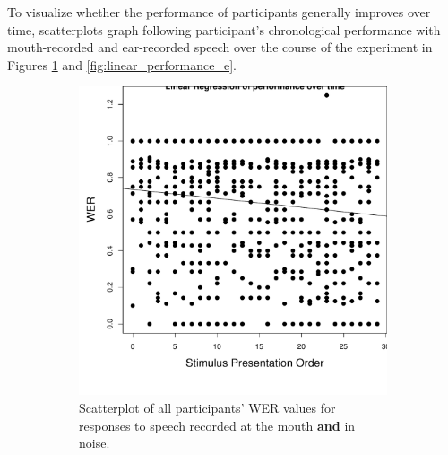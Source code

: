 \documentclass[dissertation,copyright]{uathesis}
\makeatletter
\def\maxwidth{ %
  \ifdim\Gin@nat@width>\linewidth
    \linewidth
  \else
    \Gin@nat@width
  \fi
}
\makeatother
\begin{document}
To visualize whether the performance of participants generally improves over time, scatterplots graph following participant's chronological performance with mouth-recorded and ear-recorded speech over the course of the experiment in Figures \ref{fig:linear_performance_m} and \ref{fig:linear_performance_e}. 
%
\begin{figure}[t]%
\begin{subfigure}{0.47\textwidth}

\includegraphics[width=\maxwidth]{figure/line_graph_chrono_m-1} 

\caption{Scatterplot of all participants' WER values for responses to speech recorded at the mouth \textbf{and} in noise.}
\label{fig:linear_performance_m}
\end{subfigure}
\begin{subfigure}{0.47\textwidth}%


\end{subfigure}
\end{figure}
\end{document}
